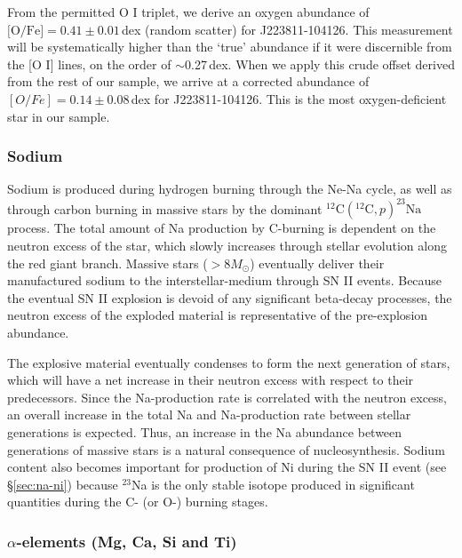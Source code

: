 \documentclass{emulateapj}
\begin{document}
From the permitted O \textsc{I} triplet, we derive an oxygen abundance of $\mbox{[O/Fe]} = 0.41 \pm 0.01$\,dex (random scatter) for J223811-104126. This measurement will be systematically higher than the `true' abundance if it were discernible from the [O \textsc{I}] lines, on the order of $\sim{}$0.27\,dex. When we apply this crude offset derived from the rest of our sample, we arrive at a corrected abundance of $[O/Fe] = 0.14 \pm 0.08$\,dex for J223811-104126. This is the most oxygen-deficient star in our sample.


\subsubsection{Sodium}

Sodium is produced during hydrogen burning through the Ne-Na cycle, as well as through carbon burning in massive stars by the dominant $^{12}\mbox{C}(^{12}\mbox{C}, p)^{23}\mbox{Na}$ process. The total amount of Na production by C-burning is dependent on the neutron excess of the star, which slowly increases through stellar evolution along the red giant branch. Massive stars ($>8 M_\odot$) eventually deliver their manufactured sodium to the interstellar-medium through SN II events. Because the eventual SN II explosion is devoid of any significant beta-decay processes, the neutron excess of the exploded material is representative of the pre-explosion abundance.  
  
The explosive material eventually condenses to form the next generation of stars, which will have a net increase in their neutron excess with respect to their predecessors. Since the Na-production rate is correlated with the neutron excess, an overall increase in the total Na and Na-production rate between stellar generations is expected. Thus, an increase in the Na abundance between generations of massive stars is a natural consequence of nucleosynthesis. Sodium content also becomes important for production of Ni during the SN II event (see \S\ref{sec:na-ni}) because $^{23}$Na is the only stable isotope produced in significant quantities during the C- (or O-) burning stages.


\subsubsection{$\alpha$-elements (Mg, Ca, Si and Ti)}
\end{document}
